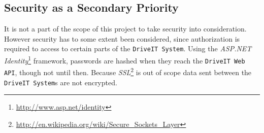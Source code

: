 \subsection{Security as a Secondary Priority}
It is not a part of the scope of this project to take security into consideration. However security has to some extent been considered, since authorization is required to access to certain parts of the \texttt{DriveIT System}. Using the \textit{ASP.NET Identity}\footnote{\url{http://www.asp.net/identity}} framework, passwords are hashed when they reach the \texttt{DriveIT Web API}, though not until then. Because \textit{SSL}\footnote{\url{http://en.wikipedia.org/wiki/Secure_Sockets_Layer}} is out of scope data sent between the \texttt{DriveIT System}s are not encrypted.

